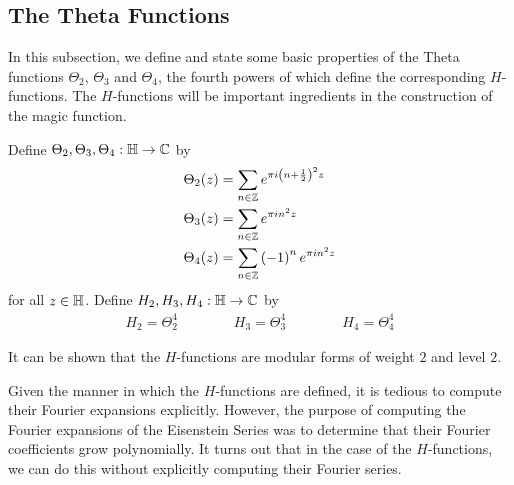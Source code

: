 \subsection{The Theta Functions}
\label{Ch2:Subsec:ThetaFunctions}

In this subsection, we define and state some basic properties of the Theta functions $\Theta_2$, $\Theta_3$ and $\Theta_4$, the fourth powers of which define the corresponding $H$-functions. The $H$-functions will be important ingredients in the construction of the magic function.

\begin{boxdefinition}\label{Ch2:Def:Theta_H}
    Define $\Theta_2, \Theta_3, \Theta_4 : \mathbb{H} \to \mathbb{C}$ by
    \begin{align*}
        \Theta_2(z) &= \sum_{n \in \mathbb{Z}} e^{\pi i \left( n + \frac{1}{2} \right)^2 z} \\
        \Theta_3(z) &= \sum_{n \in \mathbb{Z}} e^{\pi i n^2 z} \\
        \Theta_4(z) &= \sum_{n \in \mathbb{Z}} \left( -1 \right)^n e^{\pi i n^2 z}
    \end{align*}
    for all $z \in \mathbb{H}$. Define $H_2, H_3, H_4 : \mathbb{H} \to \mathbb{C}$ by
    \begin{align*}
        H_2 = \Theta_2^4 \qquad\qquad
        H_3 = \Theta_3^4 \qquad\qquad
        H_4 = \Theta_4^4
    \end{align*}
\end{boxdefinition}

It can be shown that the $H$-functions are modular forms of weight $2$ and level $2$.

Given the manner in which the $H$-functions are defined, it is tedious to compute their Fourier expansions explicitly. However, the purpose of computing the Fourier expansions of the Eisenstein Series was to determine that their Fourier coefficients grow polynomially. It turns out that in the case of the $H$-functions, we can do this without explicitly computing their Fourier series.

